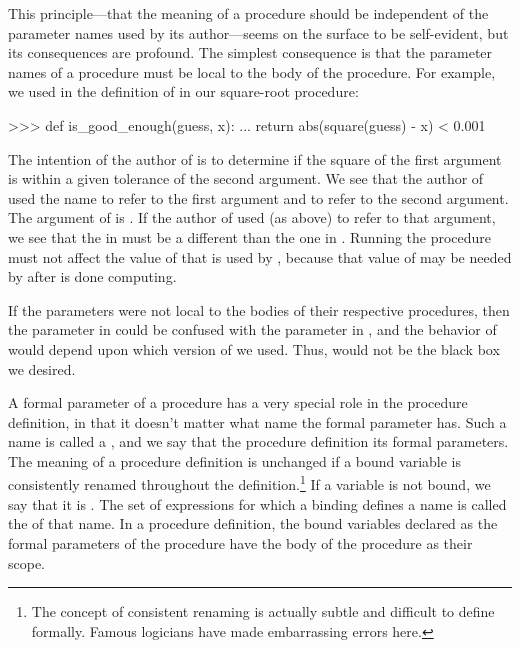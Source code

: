 \noindent
This principle---that the meaning of a procedure should be independent of the
parameter names used by its author---seems on the surface to be self-evident,
but its consequences are profound.  The simplest consequence is that the
parameter names of a procedure must be local to the body of the procedure.  For
example, we used  in the definition of  in
our square-root procedure:

\begin{codeBlock}
>>> def is_good_enough(guess, x):
...     return abs(square(guess) - x) < 0.001
\end{codeBlock}

\noindent
The intention of the author of  is to determine if the
square of the first argument is within a given tolerance of the second argument.
We see that the author of  used the name  to
refer to the first argument and  to refer to the second argument.  The
argument of  is .  If the author of  used
 (as above) to refer to that argument, we see that the  in
 must be a different  than the one in
.  Running the procedure  must not affect the value of
 that is used by , because that value of 
may be needed by  after  is done computing.

If the parameters were not local to the bodies of their respective procedures,
then the parameter  in  could be confused with the
parameter  in , and the behavior of
 would depend upon which version of  we
used. Thus,  would not be the black box we desired.

A formal parameter of a procedure has a very special role in the procedure
definition, in that it doesn't matter what name the formal parameter has.  Such
a name is called a , and we say that the procedure
definition  its formal parameters.  The meaning of a procedure
definition is unchanged if a bound variable is consistently renamed throughout
the definition.\footnote{The concept of consistent renaming is actually subtle
and difficult to define formally.  Famous logicians have made embarrassing
errors here.}  If a variable is not bound, we say that it is . The
set of expressions for which a binding defines a name is called the
 of that name.  In a procedure definition, the bound variables
declared as the formal parameters of the procedure have the body of the
procedure as their scope.

